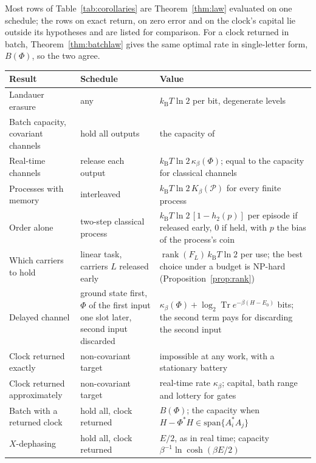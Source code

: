 \documentclass[11pt]{article}
\theoremstyle{definition}
\theoremstyle{remark}
\newcommand{\Tr}{\operatorname{Tr}}
\newcommand{\kB}{k_{\mathrm B}}
\newcommand{\Trt}{\kappa_\beta}
\begin{document}
Most rows of Table~\ref{tab:corollaries} are Theorem~\ref{thm:law} evaluated on one schedule; the rows on exact return, on zero error and on the clock's capital lie outside its hypotheses and are listed for comparison. For a clock returned in batch, Theorem~\ref{thm:batchlaw} gives the same optimal rate in single-letter form, $B(\Phi)$, so the two agree.

\begin{table}[tbp]
\centering
\small
\begin{tabular}{>{\raggedright\arraybackslash}p{4.0cm}>{\raggedright\arraybackslash}p{3.2cm}>{\raggedright\arraybackslash}p{6.2cm}}
\toprule
Result & Schedule & Value\\
\midrule
Landauer erasure~\cite{Landauer61} & any & $\kB T\ln2$ per bit, degenerate levels\\
Batch capacity, covariant channels & hold all outputs & the capacity of~\cite{FBB21}\\
Real-time channels & release each output & $\kB T\ln2\,\Trt(\Phi)$; equal to the capacity for classical channels~\cite{SaveWork}\\
Processes with memory & interleaved & $\kB T\ln2\,K_\beta(\mathcal P)$ for every finite process~\cite{Answering}\\
Order alone & two-step classical process & $\kB T\ln2\,[1-h_2(p)]$ per episode if released early, $0$ if held, with $p$ the bias of the process's coin~\cite{Answering}\\
Which carriers to hold & linear task, carriers $L$ released early & $\operatorname{rank}(F_L)\,\kB T\ln2$ per use; the best choice under a budget is NP-hard (Proposition~\ref{prop:rank})\\
Delayed channel & ground state first, $\Phi$ of the first input one slot later, second input discarded & $\Trt(\Phi)+\log_2\Tr e^{-\beta(H-E_0)}$ bits; the second term pays for discarding the second input~\cite{Answering}\\
Clock returned exactly & non-covariant target & impossible at any work, with a stationary battery~\cite{SaveWork}\\
Clock returned approximately & non-covariant target & real-time rate $\Trt$; capital, bath range and lottery for gates~\cite{SaveWork,KeepingTime}\\
Batch with a returned clock & hold all, clock returned & $B(\Phi)$; the capacity when $H-\Phi^*H\in\mathrm{span}\{A_i^*A_j\}$~\cite{KeepingTime}\\
$X$-dephasing & hold all, clock returned & $E/2$, as in real time; capacity $\beta^{-1}\ln\cosh(\beta E/2)$~\cite{KeepingTime}\\

\end{tabular}
\end{table}
\end{document}
